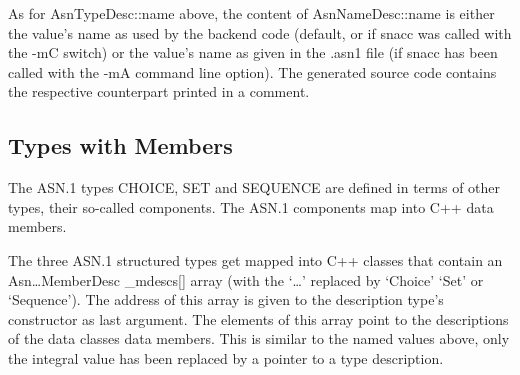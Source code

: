 As for {\C AsnTypeDesc::name} above, the content of {\C AsnNameDesc::name} is either the value's name as used by the backend code (default, or if snacc was called with the {\ufn -mC} switch) or the value's name as given in the {\ufn .asn1} file (if snacc has been called with the {\ufn -mA} command line option).
The generated source code contains the respective counterpart printed in a comment.

\subsection{Types with Members}

The ASN.1 types CHOICE, SET and SEQUENCE are defined in terms of other types, their so-called components.
The ASN.1 components map into C++ data members.

The three ASN.1 structured types get mapped into C++ classes that contain an {\C Asn\dots{}MemberDesc \_mdescs[]} array (with the `{\C \dots}' replaced by `{\C Choice}' `{\C Set}' or `{\C Sequence}').
The address of this array is given to the description type's constructor as last argument.
The elements of this array point to the descriptions of the data classes data members.
This is similar to the named values above, only the integral value has been replaced by a pointer to a type description.

